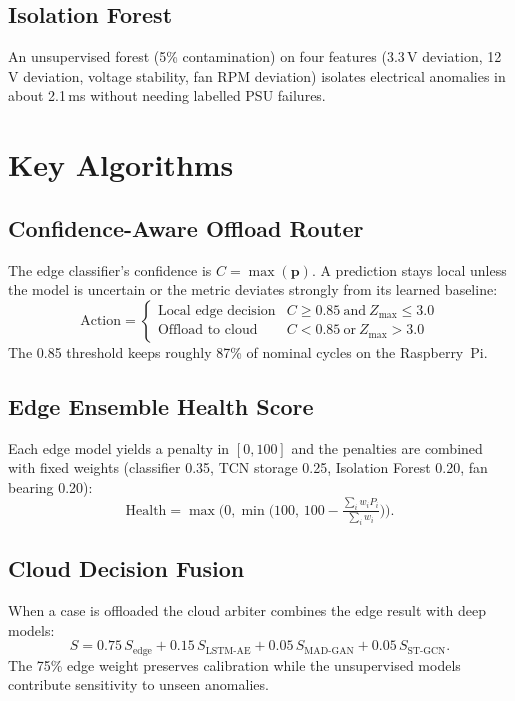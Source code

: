 \documentclass[12pt,a4paper]{report}
\begin{document}
\subsection{Isolation Forest}
An unsupervised forest (5\% contamination) on four features (3.3\,V deviation, 12\,V deviation, voltage stability, fan RPM deviation) isolates electrical anomalies in about 2.1\,ms without needing labelled PSU failures.

\section{Key Algorithms}

\subsection{Confidence-Aware Offload Router}
The edge classifier's confidence is $C=\max(\mathbf p)$. A prediction stays local unless the model is uncertain or the metric deviates strongly from its learned baseline:
\begin{equation}\label{eq:router}
  \text{Action}=\begin{cases}\text{Local edge decision} & C\ge0.85\ \text{and}\ Z_{\max}\le3.0\\ \text{Offload to cloud} & C<0.85\ \text{or}\ Z_{\max}>3.0\end{cases}
\end{equation}
The 0.85 threshold keeps roughly 87\% of nominal cycles on the Raspberry~Pi.

\subsection{Edge Ensemble Health Score}
Each edge model yields a penalty in $[0,100]$ and the penalties are combined with fixed weights (classifier 0.35, TCN storage 0.25, Isolation Forest 0.20, fan bearing 0.20):
\begin{equation}\label{eq:health}
  \text{Health}=\max\!\Big(0,\min\!\Big(100,\,100-\tfrac{\sum_i w_i P_i}{\sum_i w_i}\Big)\Big).
\end{equation}

\subsection{Cloud Decision Fusion}
When a case is offloaded the cloud arbiter combines the edge result with deep models:
\begin{equation}\label{eq:fusion}
  S = 0.75\,S_{\text{edge}}+0.15\,S_{\text{LSTM-AE}}+0.05\,S_{\text{MAD-GAN}}+0.05\,S_{\text{ST-GCN}}.
\end{equation}
The 75\% edge weight preserves calibration while the unsupervised models contribute sensitivity to unseen anomalies.
\end{document}
